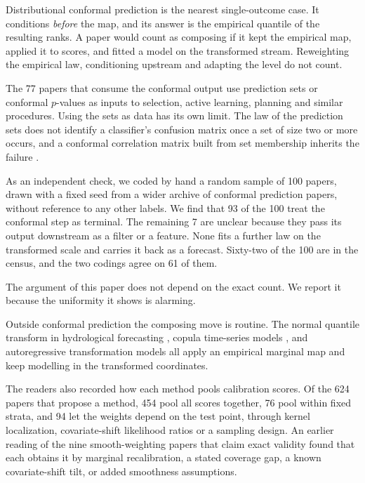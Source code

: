 \documentclass[11pt]{article}
\theoremstyle{remark}
\begin{document}
Distributional conformal prediction \citep{chernozhukov2021distributional} is the
nearest single-outcome case. It conditions \emph{before} the map, and its answer is
the empirical quantile of the resulting ranks. A paper would count as composing if it
kept the empirical map, applied it to scores, and fitted a model on the transformed
stream. Reweighting the empirical law, conditioning upstream and adapting the level
do not count.

The 77 papers that consume the conformal output use prediction sets or conformal
$p$-values as inputs to selection, active learning, planning and similar procedures. Using the sets as data
has its own limit. The law of the prediction sets does not identify a classifier's
confusion matrix once a set of size two or more occurs, and a conformal correlation
matrix built from set membership inherits the failure \citep{cotton2026correlation}.

As an independent check, we coded by hand a random sample of 100 papers, drawn with a
fixed seed from a wider archive of conformal prediction papers, without reference to
any other labels. We find that 93 of the 100 treat the conformal step as terminal. The
remaining 7 are unclear because they pass its output downstream as a filter or a
feature. None fits a further law on the transformed scale and carries it back as a
forecast. Sixty-two of the 100 are in the census, and the two codings agree on 61 of
them.

The argument of this paper does not depend on the exact count. We report it because
the uniformity it shows is alarming.

Outside conformal prediction the composing move is routine. The normal quantile
transform in hydrological forecasting \citep{bogner2012}, copula time-series
models \citep{chenfan2006}, and autoregressive transformation models
\citep{rugamer2023} all apply an empirical marginal map and keep modelling in
the transformed coordinates.

The readers also recorded how each method pools calibration scores. Of the 624 papers
that propose a method, 454 pool all scores together, 76 pool within fixed strata, and
94 let the weights depend on the test point, through kernel localization,
covariate-shift likelihood ratios or a sampling design. An earlier reading of the nine
smooth-weighting papers that claim exact validity found that each obtains it by
marginal recalibration, a stated coverage gap, a known covariate-shift tilt, or added
smoothness assumptions.
\end{document}
